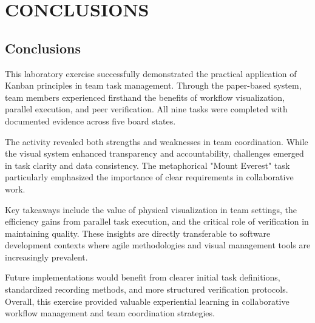 \chapter{CONCLUSIONS}\label{ch:conclusion}
\section{Conclusions}
This laboratory exercise successfully demonstrated the practical application of Kanban principles in team task management. Through the paper-based system, team members experienced firsthand the benefits of workflow visualization, parallel execution, and peer verification. All nine tasks were completed with documented evidence across five board states.

The activity revealed both strengths and weaknesses in team coordination. While the visual system enhanced transparency and accountability, challenges emerged in task clarity and data consistency. The metaphorical "Mount Everest" task particularly emphasized the importance of clear requirements in collaborative work.

Key takeaways include the value of physical visualization in team settings, the efficiency gains from parallel task execution, and the critical role of verification in maintaining quality. These insights are directly transferable to software development contexts where agile methodologies and visual management tools are increasingly prevalent.

Future implementations would benefit from clearer initial task definitions, standardized recording methods, and more structured verification protocols. Overall, this exercise provided valuable experiential learning in collaborative workflow management and team coordination strategies.

